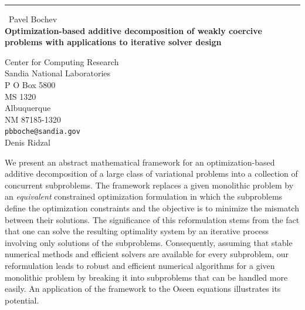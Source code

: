 \documentclass{report}
\begin{document}
\begin{center}
\rule{6in}{1pt} \
{\large Pavel Bochev \\
{\bf Optimization-based additive decomposition of weakly coercive problems with applications to iterative solver design}}

Center for Computing Research \\ Sandia National Laboratories \\ P O Box 5800 \\ MS 1320 \\ Albuquerque \\ NM 87185-1320
\\
{\tt pbboche@sandia.gov}\\
Denis Ridzal\end{center}

We present an abstract mathematical framework for an optimization-based
additive decomposition of a large class of variational problems into a
collection of concurrent subproblems. The framework replaces a given
monolithic problem by an \emph{equivalent} constrained optimization
formulation in which the subproblems define the optimization constraints
and the objective is to minimize the mismatch between their solutions.
The significance of this reformulation stems from the fact that one can
solve the resulting optimality system by an iterative process involving
only solutions of the subproblems. Consequently, assuming that stable
numerical methods and efficient solvers are available for every
subproblem, our reformulation leads to robust and efficient numerical
algorithms for a given monolithic problem by breaking it into subproblems
that can be handled more easily. An application of the framework to the
Oseen equations illustrates its potential.
\end{document}
